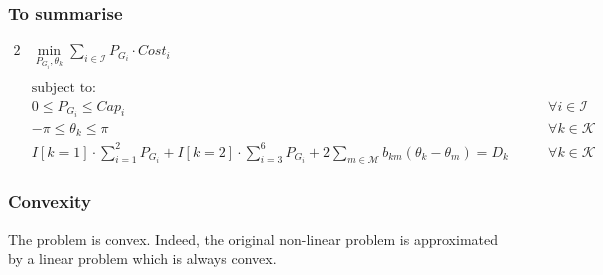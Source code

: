 \subsubsection*{To summarise}
\begin{alignat*}{2}
&\min_{P_{G_i}, \theta_k} \sum_{i \in \mathcal{I}} P_{G_i} \cdot Cost_i\\
&\\
&\text{subject to:}\nonumber \\
&0 \leq P_{G_i} \leq Cap_i  &\qquad \forall i \in \mathcal{I}\\
&  -\pi \leq \theta_k \leq \pi  &\qquad \forall k \in \mathcal{K}\\
&  I[k = 1] \cdot \sum_{i = 1}^{2} P_{G_i} + I[k = 2] \cdot \sum_{i = 3}^{6} P_{G_i} + 2 \sum_{m \in \mathcal{M}} b_{km} (\theta_k − \theta_m)  = D_k &\qquad \forall k \in \mathcal{K} 
\end{alignat*} 

\subsubsection*{Convexity}
The problem is convex. Indeed, the original non-linear problem is approximated by a linear problem which is always convex. 
